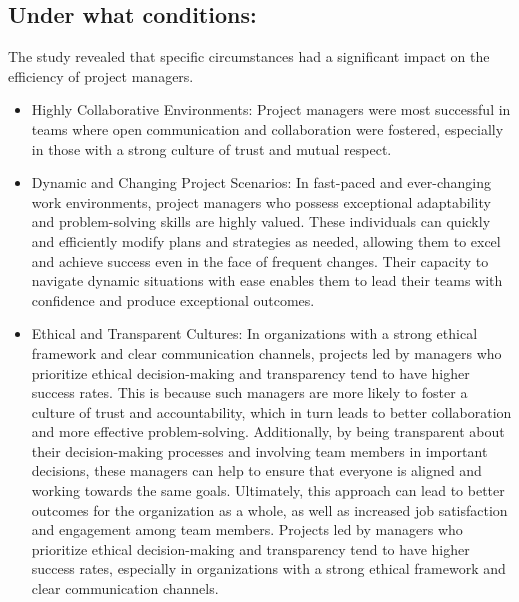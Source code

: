 \documentclass{article}
\begin{document}
\subsection{Under what conditions:}
The study revealed that specific circumstances had a significant impact on the efficiency of project managers.
\begin{itemize}
    \item Highly Collaborative Environments: Project managers were most successful in teams where open communication and collaboration were fostered, especially in those with a strong culture of trust and mutual respect.
    \item Dynamic and Changing Project Scenarios: In fast-paced and ever-changing work environments, project managers who possess exceptional adaptability and problem-solving skills are highly valued. These individuals can quickly and efficiently modify plans and strategies as needed, allowing them to excel and achieve success even in the face of frequent changes. Their capacity to navigate dynamic situations with ease enables them to lead their teams with confidence and produce exceptional outcomes\cite{relationship_between_project_manage}.
    \item Ethical and Transparent Cultures: In organizations with a strong ethical framework and clear communication channels, projects led by managers who prioritize ethical decision-making and transparency tend to have higher success rates. This is because such managers are more likely to foster a culture of trust and accountability, which in turn leads to better collaboration and more effective problem-solving. Additionally, by being transparent about their decision-making processes and involving team members in important decisions, these managers can help to ensure that everyone is aligned and working towards the same goals. Ultimately, this approach can lead to better outcomes for the organization as a whole, as well as increased job satisfaction and engagement among team members. Projects led by managers who prioritize ethical decision-making and transparency tend to have higher success rates, especially in organizations with a strong ethical framework and clear communication channels\cite{Project_Management_Techniques}.
\end{itemize}
\end{document}
